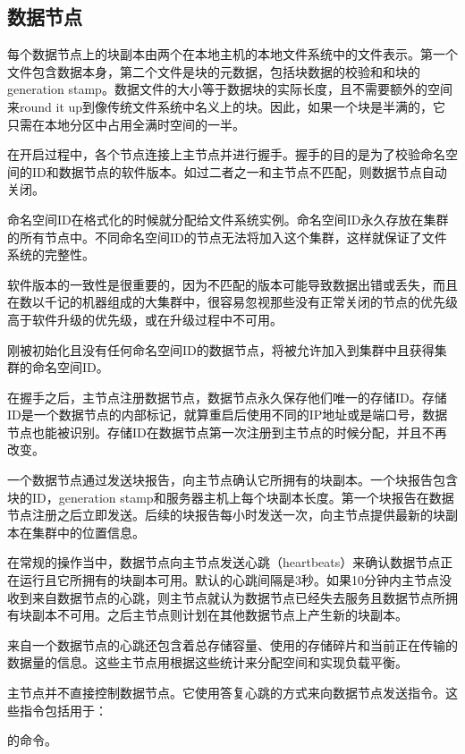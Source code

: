 \subsection{数据节点}

每个数据节点上的块副本由两个在本地主机的本地文件系统中的文件表示。第一个文件包含数据本身，第二个文件是块的元数据，包括块数据的校验和和块的generation stamp。数据文件的大小等于数据块的实际长度，且不需要额外的空间来round it up到像传统文件系统中名义上的块。因此，如果一个块是半满的，它只需在本地分区中占用全满时空间的一半。

在开启过程中，各个节点连接上主节点并进行握手。握手的目的是为了校验命名空间的ID和数据节点的软件版本。如过二者之一和主节点不匹配，则数据节点自动关闭。

命名空间ID在格式化的时候就分配给文件系统实例。命名空间ID永久存放在集群的所有节点中。不同命名空间ID的节点无法将加入这个集群，这样就保证了文件系统的完整性。

软件版本的一致性是很重要的，因为不匹配的版本可能导致数据出错或丢失，而且在数以千记的机器组成的大集群中，很容易忽视那些没有正常关闭的节点的优先级高于软件升级的优先级，或在升级过程中不可用。

刚被初始化且没有任何命名空间ID的数据节点，将被允许加入到集群中且获得集群的命名空间ID。

在握手之后，主节点注册数据节点，数据节点永久保存他们唯一的存储ID。存储ID是一个数据节点的内部标记，就算重启后使用不同的IP地址或是端口号，数据节点也能被识别。存储ID在数据节点第一次注册到主节点的时候分配，并且不再改变。

一个数据节点通过发送块报告，向主节点确认它所拥有的块副本。一个块报告包含块的ID，generation stamp和服务器主机上每个块副本长度。第一个块报告在数据节点注册之后立即发送。后续的块报告每小时发送一次，向主节点提供最新的块副本在集群中的位置信息。

在常规的操作当中，数据节点向主节点发送心跳（heartbeats）来确认数据节点正在运行且它所拥有的块副本可用。默认的心跳间隔是3秒。如果10分钟内主节点没收到来自数据节点的心跳，则主节点就认为数据节点已经失去服务且数据节点所拥有块副本不可用。之后主节点则计划在其他数据节点上产生新的块副本。

来自一个数据节点的心跳还包含着总存储容量、使用的存储碎片和当前正在传输的数据量的信息。这些主节点用根据这些统计来分配空间和实现负载平衡。

主节点并不直接控制数据节点。它使用答复心跳的方式来向数据节点发送指令。这些指令包括用于：
\begin{itemize}
\end{itemize}	
的命令。

